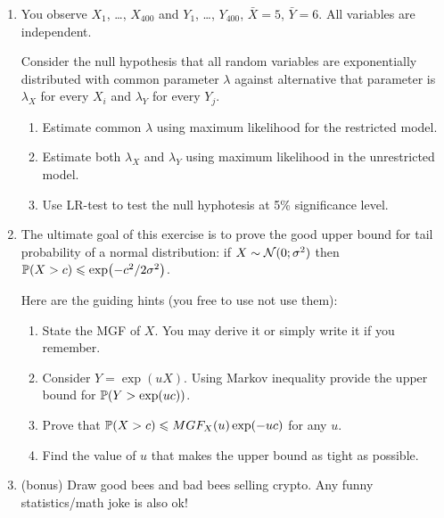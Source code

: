 \begin{enumerate}
\item You observe $X_1$, \ldots, $X_{400}$ and $Y_1$, \ldots, $Y_{400}$, $\bar X = 5$, $\bar Y = 6$. 
All variables are independent. 

Consider the null hypothesis that all random variables are exponentially distributed with common parameter $\lambda$ against alternative
that parameter is $\lambda_X$ for every $X_i$ and $\lambda_Y$ for every $Y_j$. 

\begin{enumerate}
	\item Estimate common $\lambda$ using maximum likelihood for the restricted model. 
	\item Estimate both $\lambda_X$ and $\lambda_Y$ using maximum likelihood in the unrestricted model. 
	\item Use LR-test to test the null hyphotesis at 5\% significance level. 
\end{enumerate}

\item The ultimate goal of this exercise is to prove the good upper bound for tail probability of a normal distribution: 
if $X\sim \cN(0; \sigma^2)$ then $\P(X > c) \leq \exp(-c^2/2\sigma^2)$.

Here are the guiding hints (you free to use not use them): 

\begin{enumerate}
	\item State the MGF of $X$. You may derive it or simply write it if you remember.
	\item Consider $Y = \exp(uX)$. Using Markov inequality provide the upper bound for $\P(Y > \exp(uc))$.
	\item Prove that $\P(X > c) \leq MGF_X(u)\exp(-uc)$ for any $u$.
	\item Find the value of $u$ that makes the upper bound as tight as possible. 
\end{enumerate}


\item (bonus) Draw good bees and bad bees selling crypto. Any funny statistics/math joke is also ok!

\end{enumerate}





